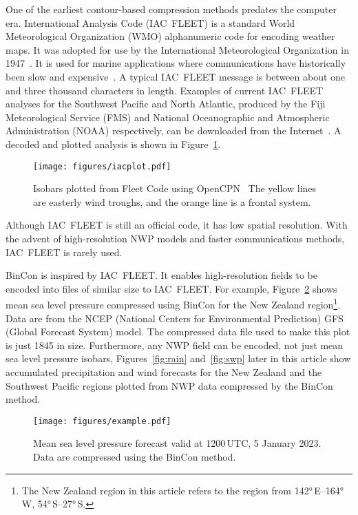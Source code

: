 \documentclass[12pt,a4paper]{article}
\begin{document}
One of the earliest contour-based compression methods predates the
computer era. International Analysis Code (IAC~FLEET) is a standard
World Meteorological Organization (WMO) alphanumeric code for encoding
weather maps. It was adopted for use by the International Meteorological
Organization in 1947~\citep[Resolution 156, p.~161]{imo1947}. It is used for
marine applications where communications have historically been slow and
expensive~\citep[pp.~87--90]{wmo2019a}. A typical IAC~FLEET message is
between about one and three thousand characters in length. Examples of current
IAC~FLEET analyses for the Southwest Pacific and North Atlantic,
produced by the Fiji Meteorological Service (FMS) and National
Oceanographic and Atmospheric Administration (NOAA) respectively, can
be downloaded from the Internet~\citep{fms2023, noaa2023}. A decoded and
plotted analysis is shown in Figure~\ref{fig:iacplot}.

\begin{figure}
\centering
\texttt{[image: figures/iacplot.pdf]}
\caption{\label{fig:iacplot}Isobars plotted from Fleet Code using
OpenCPN~\citep{opencpn2023} The yellow lines are easterly wind troughs, and the
orange line is a frontal system.}
\end{figure}

Although IAC~FLEET is still an official code, it has low spatial resolution.
With the advent of high-resolution NWP models and faster communications
methods, IAC~FLEET is rarely used.

BinCon is inspired by IAC~FLEET. It enables high-resolution fields to be
encoded into files of similar size to IAC~FLEET. For example,
Figure~\ref{fig:BinCon} shows mean sea level pressure compressed using BinCon
for the New Zealand region\footnote{The New Zealand region in this article
refers to the region from \ang{142}\,E--\ang{164}\,W,
\ang{54}\,S--\ang{27}\,S.}. Data are from the NCEP (National Centers for
Environmental Prediction) GFS (Global Forecast System) model. The compressed
data file used to make this plot is just \SI{1845}{\byte} in size. Furthermore,
any NWP field can be encoded, not just mean sea level pressure isobars,
Figures~\ref{fig:rain} and~\ref{fig:swp} later in this article show accumulated
precipitation and wind forecasts for the New Zealand and the Southwest Pacific
regions plotted from NWP data compressed by the BinCon method.

\begin{figure}
\centering
\texttt{[image: figures/example.pdf]}
\caption{\label{fig:BinCon}Mean sea level pressure forecast valid at
1200\,UTC, 5 January 2023. Data are compressed using the BinCon
method.}
\end{figure}
\end{document}
